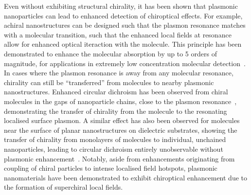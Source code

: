 Even without exhibiting structural chirality, it has been shown that plasmonic nanoparticles can lead to enhanced detection of chiroptical effects. For example, achiral nanostructures can be designed such that the plasmon resonance matches with a molecular transition, such that the enhanced local fields at resonance allow for enhanced optical iteraction with the molecule. This principle has been demonstrated to enhance the molecular absorption by up to 5 orders of magnitude, for applications in extremely low concentration molecular detection~\cite{Cheng2015}. In cases where the plasmon resonance is away from any molecular resonance, chirality can still be ``transferred'' from molecules to nearby plasmonic nanostructures. Enhanced circular dichroism has been observed from chiral molecules in the gaps of nanoparticle chains, close to the plasmon resonance~\cite{Zhang2013, Wang2014c, DiGregorio2015}, demonstrating the transfer of chirality from the molecule to the resonating localised surface plasmon. A similar effect has also been observed for molecules near the surface of planar nanostructures on dielectric substrates, showing the transfer of chirality from monolayers of molecules to individual, unchained nanoparticles, leading to circular dichroism entirely unobservable without plasmonic enhancement~\cite{Maoz2013}. Notably, aside from enhancements originating from coupling of chiral particles to intense localised field hotspots, plasmonic nanomaterials have been demonstrated to exhibit chiroptical enhancement due to the formation of superchiral local fields.


